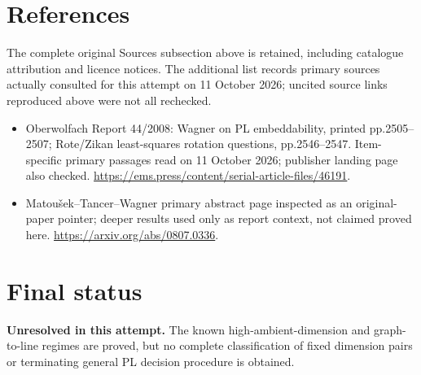 \documentclass[11pt]{article}
\begin{document}
\section{References}
The complete original Sources subsection above is retained, including catalogue attribution and licence notices. The additional list records primary sources actually consulted for this attempt on 11 October 2026; uncited source links reproduced above were not all rechecked.
\begin{itemize}
\item Oberwolfach Report 44/2008: Wagner on PL embeddability, printed pp.2505--2507; Rote/Zikan least-squares rotation questions, pp.2546--2547. Item-specific primary passages read on 11 October 2026; publisher landing page also checked. \url{https://ems.press/content/serial-article-files/46191}.
\item Matoušek--Tancer--Wagner primary abstract page inspected as an original-paper pointer; deeper results used only as report context, not claimed proved here. \url{https://arxiv.org/abs/0807.0336}.
\end{itemize}
\section{Final status}
\textbf{Unresolved in this attempt.} The known high-ambient-dimension and graph-to-line regimes are proved, but no complete classification of fixed dimension pairs or terminating general PL decision procedure is obtained.
\end{document}
